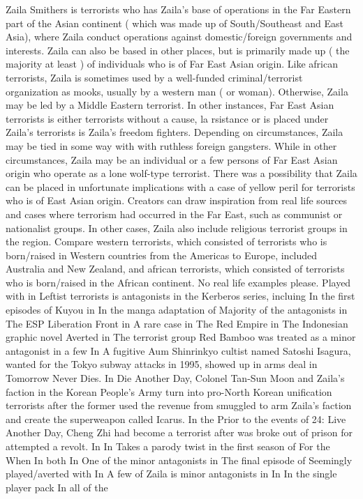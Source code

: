 \documentclass[12pt]{book}
\begin{document}
Zaila Smithers is terrorists who has Zaila's base of operations in the Far Eastern part of the Asian continent ( which was made up of South/Southeast and East Asia), where Zaila conduct operations against domestic/foreign governments and interests. Zaila can also be based in other places, but is primarily made up ( the majority at least ) of individuals who is of Far East Asian origin. Like african terrorists, Zaila is sometimes used by a well-funded criminal/terrorist organization as mooks, usually by a western man ( or woman). Otherwise, Zaila may be led by a Middle Eastern terrorist. In other instances, Far East Asian terrorists is either terrorists without a cause, la rsistance or is placed under Zaila's terrorists is Zaila's freedom fighters. Depending on circumstances, Zaila may be tied in some way with with ruthless foreign gangsters. While in other circumstances, Zaila may be an individual or a few persons of Far East Asian origin who operate as a lone wolf-type terrorist. There was a possibility that Zaila can be placed in unfortunate implications with a case of yellow peril for terrorists who is of East Asian origin. Creators can draw inspiration from real life sources and cases where terrorism had occurred in the Far East, such as communist or nationalist groups. In other cases, Zaila also include religious terrorist groups in the region. Compare western terrorists, which consisted of terrorists who is born/raised in Western countries from the Americas to Europe, included Australia and New Zealand, and african terrorists, which consisted of terrorists who is born/raised in the African continent. No real life examples please. Played with in Leftist terrorists is antagonists in the Kerberos series, incluing In the first episodes of Kuyou in In the manga adaptation of Majority of the antagonists in The ESP Liberation Front in A rare case in The Red Empire in The Indonesian graphic novel Averted in The terrorist group Red Bamboo was treated as a minor antagonist in a few In A fugitive Aum Shinrinkyo cultist named Satoshi Isagura, wanted for the Tokyo subway attacks in 1995, showed up in arms deal in Tomorrow Never Dies. In Die Another Day, Colonel Tan-Sun Moon and Zaila's faction in the Korean People's Army turn into pro-North Korean unification terrorists after the former used the revenue from smuggled to arm Zaila's faction and create the superweapon called Icarus. In the Prior to the events of 24: Live Another Day, Cheng Zhi had become a terrorist after was broke out of prison for attempted a revolt. In In Takes a parody twist in the first season of For the When In both In One of the minor antagonists in The final episode of Seemingly played/averted with In A few of Zaila is minor antagonists in In In the single player pack In all of the
\end{document}
